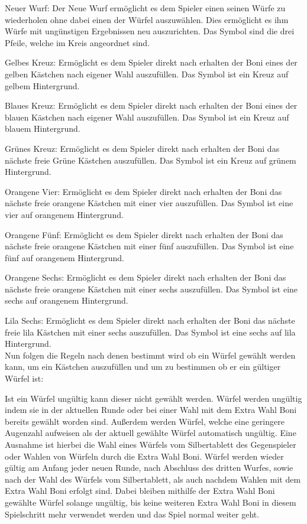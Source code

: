 Neuer Wurf: Der Neue Wurf ermöglicht es dem Spieler einen seinen Würfe zu wiederholen ohne dabei einen der Würfel auszuwählen. Dies ermöglicht es ihm Würfe mit ungünstigen Ergebnissen neu auszurichten. Das Symbol sind die drei Pfeile, welche im Kreis angeordnet sind.

Gelbes Kreuz: Ermöglicht es dem Spieler direkt nach erhalten der Boni eines der gelben Kästchen nach eigener Wahl auszufüllen. Das Symbol ist ein Kreuz auf gelbem Hintergrund.

Blaues Kreuz: Ermöglicht es dem Spieler direkt nach erhalten der Boni eines der blauen Kästchen nach eigener Wahl auszufüllen. Das Symbol ist ein Kreuz auf blauem Hintergrund.

Grünes Kreuz: Ermöglicht es dem Spieler direkt nach erhalten der Boni das nächste freie Grüne Kästchen auszufüllen. Das Symbol ist ein Kreuz auf grünem Hintergrund.

Orangene Vier: Ermöglicht es dem Spieler direkt nach erhalten der Boni das nächste freie orangene Kästchen mit einer vier auszufüllen. Das Symbol ist eine vier auf orangenem Hintergrund.

Orangene Fünf: Ermöglicht es dem Spieler direkt nach erhalten der Boni das nächste freie orangene Kästchen mit einer fünf auszufüllen. Das Symbol ist eine fünf auf orangenem Hintergrund.

Orangene Sechs: Ermöglicht es dem Spieler direkt nach erhalten der Boni das nächste freie orangene Kästchen mit einer sechs auszufüllen. Das Symbol ist eine sechs auf orangenem Hintergrund.

Lila Sechs: Ermöglicht es dem Spieler direkt nach erhalten der Boni das nächste freie lila Kästchen mit einer sechs auszufüllen. Das Symbol ist eine sechs auf lila Hintergrund. \\

Nun folgen die Regeln nach denen bestimmt wird ob ein Würfel gewählt werden kann, um ein Kästchen auszufüllen und um zu bestimmen ob er ein gültiger Würfel ist:

Ist ein Würfel ungültig kann dieser nicht gewählt werden. Würfel werden ungültig indem sie in der aktuellen Runde oder bei einer Wahl mit dem Extra Wahl Boni bereits gewählt worden sind. Außerdem werden Würfel, welche eine geringere Augenzahl aufweisen als der aktuell gewählte Würfel automatisch ungültig. Eine Ausnahme ist hierbei die Wahl eines Würfels vom Silbertablett des Gegenspieler oder Wahlen von Würfeln durch die Extra Wahl Boni. Würfel werden wieder gültig am Anfang jeder neuen Runde, nach Abschluss des dritten Wurfes, sowie nach der Wahl des Würfels vom Silbertablett, als auch nachdem Wahlen mit dem Extra Wahl Boni erfolgt sind. Dabei bleiben mithilfe der Extra Wahl Boni gewählte Würfel solange ungültig, bis keine weiteren Extra Wahl Boni in diesem Spielschritt mehr verwendet werden und das Spiel normal weiter geht.

